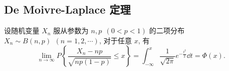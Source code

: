\subsection{De Moivre-Laplace 定理}

\begin{theorem}
    设随机变量 $ X_{n} $ 服从参数为 $ n, p~~(0<p<1)$ 的二项分布 $ X_{n} \sim B(n, p)~~(n=1,2, \cdots) $, 对于任意 $ x $, 有
    $$\lim _{n \rightarrow \infty} P\left\{\frac{X_{n}-n p}{\sqrt{n p(1-p)}} \leqslant x\right\}=\int_{-\infty}^{x} \frac{1}{\sqrt{2 \pi}} e^{-\frac{t^{2}}{2}} \dd  t=\varPhi(x).$$
\end{theorem}
